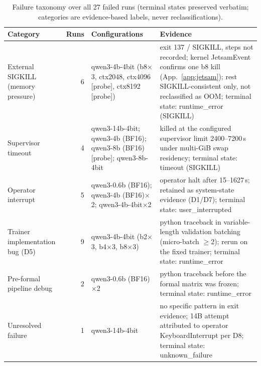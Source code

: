 \begin{table}[t]\centering
\caption{Failure taxonomy over all 27 failed runs (terminal states preserved verbatim; categories are evidence-based labels, never reclassifications).}
\label{tab:failures}
\footnotesize\setlength{\tabcolsep}{4pt}
\begin{tabular}{p{3.0cm}rp{3.4cm}p{7.0cm}}
\toprule
Category & Runs & Configurations & Evidence\\
\midrule
External SIGKILL (memory pressure) & 6 & qwen3-4b-4bit (b8$\times$3, ctx2048, ctx4096 [probe], ctx8192 [probe]) & exit 137 / SIGKILL, steps not recorded; kernel JetsamEvent confirms one b8 kill (App.~\ref{app:jetsam}); rest SIGKILL-consistent only, not reclassified as OOM; terminal state: runtime\_error (SIGKILL)\\
Supervisor timeout & 4 & qwen3-14b-4bit; qwen3-4b (BF16); qwen3-8b (BF16) [probe]; qwen3-8b-4bit & killed at the configured supervisor limit 2400--7200\,s under multi-GiB swap residency; terminal state: timeout (SIGKILL)\\
Operator interrupt & 5 & qwen3-0.6b (BF16); qwen3-4b (BF16)$\times$2; qwen3-4b-4bit$\times$2 & operator halt after 15--1627\,s; retained as system-state evidence (D1/D7); terminal state: user\_interrupted\\
Trainer implementation bug (D5) & 9 & qwen3-4b-4bit (b2$\times$3, b4$\times$3, b8$\times$3) & python traceback in variable-length validation batching (micro-batch $\ge$2); rerun on the fixed trainer; terminal state: runtime\_error\\
Pre-formal pipeline debug & 2 & qwen3-0.6b (BF16)$\times$2 & python traceback before the formal matrix was frozen; terminal state: runtime\_error\\
Unresolved failure & 1 & qwen3-14b-4bit & no specific pattern in exit evidence; 14B attempt attributed to operator KeyboardInterrupt per D8; terminal state: unknown\_failure\\
\bottomrule
\end{tabular}
\end{table}
